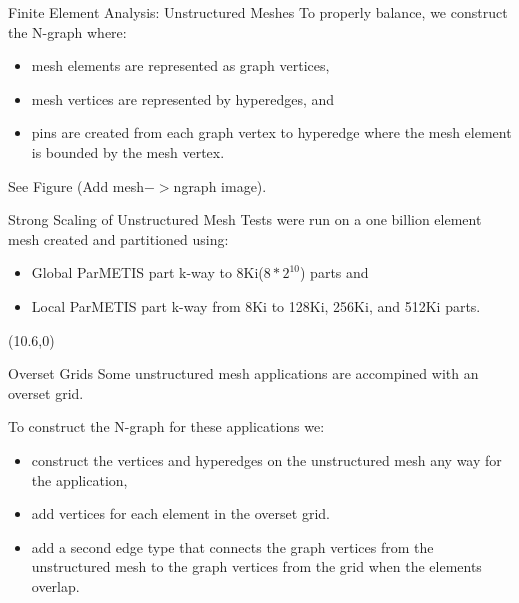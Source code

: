 \documentclass{beamer}
\begin{document}
\begin{textblock}{15.6}
\begin{textblock}{5}
\begin{block}{Finite Element Analysis: Unstructured Meshes}
      To properly balance, we construct the N-graph where:
      \begin{itemize}
      \item mesh elements are represented as graph vertices,
      \item mesh vertices are represented by hyperedges, and
      \item pins are created from each graph vertex to hyperedge where the mesh element is bounded by the mesh vertex.
      \end{itemize}
      See Figure (Add mesh$->$ngraph image).

    \end{block}
    \begin{block}{Strong Scaling of Unstructured Mesh}
      Tests were run on a one billion element mesh created and partitioned using:
      \begin{itemize}
      \item Global ParMETIS part k-way to 8Ki($8*2^{10}$) parts and
      \item Local ParMETIS part k-way from 8Ki to 128Ki, 256Ki, and 512Ki parts.
      \end{itemize}

    \end{block}
  \end{textblock}
  \begin{textblock}{5}(10.6,0)
    \begin{block}{Overset Grids}
      Some unstructured mesh applications are accompined with an overset grid.

      
      To construct the N-graph for these applications we:
      \begin{itemize}
      \item construct the vertices and hyperedges on the unstructured mesh any way for the application,
      \item add vertices for each element in the overset grid.
      \item add a second edge type that connects the graph vertices from the unstructured mesh to the graph vertices from the grid when the elements overlap.
      \end{itemize}


\end{block}
\end{textblock}
\end{textblock}
\end{document}
